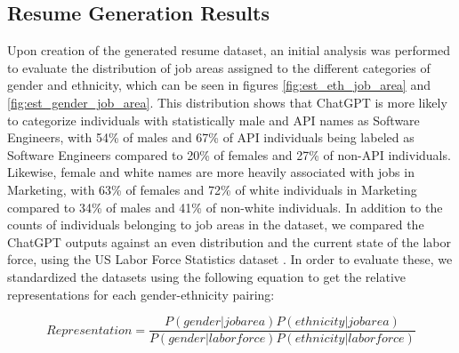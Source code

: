 \documentclass{article}
\begin{document}
\subsection{Resume Generation Results}

    Upon creation of the generated resume dataset, an initial analysis was performed to evaluate the distribution of job areas assigned to the different categories of gender and ethnicity, which can be seen in figures \ref{fig:est_eth_job_area} and \ref{fig:est_gender_job_area}. This distribution shows that ChatGPT is more likely to categorize individuals with statistically male and API names as Software Engineers, with 54\% of males and 67\% of API individuals being labeled as Software Engineers compared to 20\% of females and 27\% of non-API individuals. Likewise, female and white names are more heavily associated with jobs in Marketing, with 63\% of females and 72\% of white individuals in Marketing compared to 34\% of males and 41\% of non-white individuals. In addition to the counts of individuals belonging to job areas in the dataset, we compared the ChatGPT outputs against an even distribution and the current state of the labor force, using the US Labor Force Statistics dataset \cite{USBL}. In order to evaluate these, we standardized the datasets using the following equation to get the relative representations for each gender-ethnicity pairing:

    \begin{equation}
    Representation = \frac{ P(gender | job area)P(ethnicity | job area) }{ P(gender | labor force)P(ethnicity | labor force) }
    \end{equation}
\end{document}
